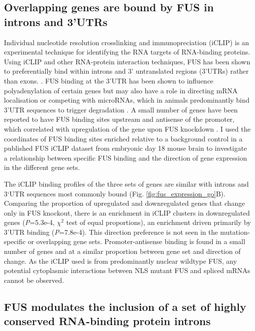 \subsection{ Overlapping genes are bound by FUS in introns and 3'UTRs}

Individual nucleotide resolution crosslinking and immunopreciation (iCLIP) is an experimental technique for identifying the RNA targets of RNA-binding proteins. 
Using iCLIP and other RNA-protein interaction techniques, FUS has been shown to preferentially bind within introns and 3' untranslated regions (3'UTRs) rather than exons. \citep{Lagier-Tourenne2012-wa, Rogelj2012, Ishigaki2012, Masuda2015, Kapeli2016}. 
FUS binding at the 3'UTR has been shown to influence polyadenylation of certain genes \citep{Masuda2015} but may also have a role in directing mRNA localisation or competing with microRNAs, which in animals predominantly bind 3'UTR sequences to trigger degradation \citep{Lee1993,Carthew2009}.
A small number of genes have been reported to have FUS binding  sites upstream and antisense of the promoter, which correlated with upregulation of the gene upon FUS knockdown \citep{Ishigaki2012}.
I used the coordinates of FUS binding sites enriched relative to a background control in a published FUS iCLIP dataset from embryonic day 18 mouse brain \citep{Rogelj2012} to investigate a relationship between specific FUS binding and the direction of gene expression in the different gene sets.

The iCLIP binding profiles of the three sets of genes are similar with introns and 3`UTR sequences most commonly bound (Fig. \ref{fig:fus_expression_go}B).  
Comparing the proportion of upregulated and downregulated genes that change only in FUS knockout, there is an enrichment in iCLIP clusters in downregulated genes (\textit{P}=5.3e-4, $\chi^2$ test of equal proportions), an enrichment driven primarily by 3'UTR binding (\textit{P}=7.8e-4). 
This direction preference is not seen in the mutation-specific or overlapping gene sets.
Promoter-antisense binding is found in a small number of genes and at a similar proportion between gene set and direction of change.
As the iCLIP used is from predominantly nuclear wildtype FUS, any potential cytoplasmic interactions between NLS mutant FUS and spliced mRNAs cannot be observed.



\subsection{FUS modulates the inclusion of a set of highly conserved RNA-binding protein introns}


